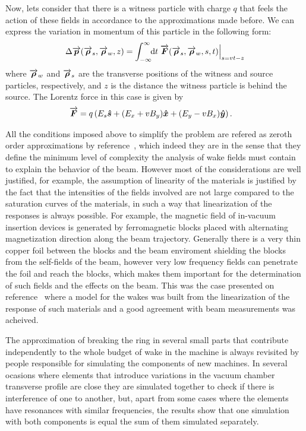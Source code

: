     Now, lets consider that there is a witness particle with charge $q$ that feels the action of these fields in accordance to the approximations made before. We can express the variation in momentum of this particle in the following form:
    \begin{align}\label{eq:momentum_gain}
  	  	\Delta \overrightarrow{\boldsymbol{p}}(\overrightarrow{\boldsymbol{\rho}}_s, \overrightarrow{\boldsymbol{\rho}}_w, z) = \int_{-\infty}^{\infty}\!\!\text{d}t \left.\overrightarrow{\boldsymbol{F}}(\overrightarrow{\boldsymbol{\rho}}_s, \overrightarrow{\boldsymbol{\rho}}_w, s, t)\right|_{s=vt-z}
    \end{align}
    where $\overrightarrow{\boldsymbol{\rho}}_w$ and $\overrightarrow{\boldsymbol{\rho}}_s$ are the transverse positions of the witness and source particles, respectively, and $z$ is the distance the witness particle is behind the source. The Lorentz force in this case is given by
    \begin{align}\label{eq:lorentz_force}
  	  	\overrightarrow{\boldsymbol{F}} &= q\left(E_s\boldsymbol{\hat s} + (E_x+vB_y)\boldsymbol{\hat x} + (E_y-vB_x)\boldsymbol{\hat y}\right).
    \end{align}

    All the conditions imposed above to simplify the problem are refered as zeroth order approximations by reference~\cite{Stupakov2000a}, which indeed they are in the sense that they define the minimum level of complexity the analysis of wake fields must contain to explain the behavior of the beam. However most of the considerations are well justified, for example, the assumption of linearity of the materials is justified by the fact that the intensities of the fields involved are not large compared to the saturation curves of the materials, in such a way that linearization of the responses is always possible. For example, the magnetic field of in-vacuum insertion devices is generated by ferromagnetic blocks placed with alternating magnetization direction along the beam trajectory. Generally there is a very thin copper foil between the blocks and the beam enviroment shielding the blocks from the self-fields of the beam, however very low frequency fields can penetrate the foil and reach the blocks, which makes them important for the determination of such fields and the effects on the beam. This was the case presented on reference~\cite{Bassi} where a model for the wakes was built from the linearization of the response of such materials and a good agreement with beam measurements was acheived.

    The approximation of breaking the ring in several small parts that contribute independently to the whole budget of wake in the machine is always revisited by people responsible for simulating the components of new machines. In several ocasions where elements that introduce variations in the vacuum chamber transverse profile are close they are simulated together to check if there is interference of one to another, but, apart from some cases where the elements have resonances with similar frequencies, the results show that one simulation with both components is equal the sum of them simulated separately.

